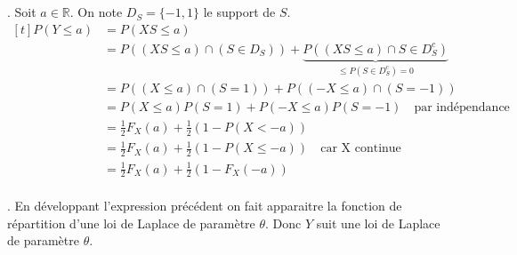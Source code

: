 \documentclass{report}
\begin{document}
\subsection{} \noindent{}\\ 
\\ 
\\
. Soit $a\in \mathbb R$. On note $D_S=\{-1,1\}$ le support de $S$. $$\begin{aligned}[t]
P(Y\leq a) &= P(XS \leq a)\\
&= P((XS \leq a) \cap (S\in D_S)) + \underbrace{P((XS \leq a) \cap S\in D_S^c)}_{\leq P(S\in D_S^c)=0 }\\
&= P((X \leq a) \cap (S=1)) + P((-X \leq a) \cap (S=-1)) \\
&= P(X \leq a) P(S=1) + P(-X \leq a) P (S=-1) \quad \text{par indépendance}\\
&= \frac 12 F_X(a) + \frac 12 (1-P(X<-a))\\
&= \frac 12 F_X(a) + \frac 12 (1-P(X\leq -a)) \quad \text{car X continue} \\
&= \frac 12 F_X(a) + \frac 12 (1-F_X(-a))
\end{aligned}$$\\
. En développant l'expression précédent on fait apparaitre la fonction de répartition d'une loi de Laplace de paramètre $\theta$.\newline
Donc $Y$ suit une loi de Laplace de paramètre $\theta$.

\newpage
\end{document}
